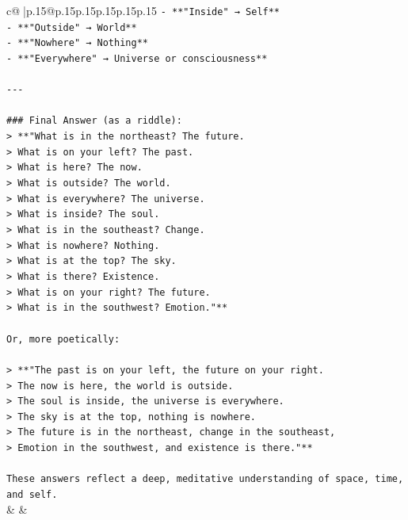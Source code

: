 \documentclass{article}
\begin{document}
{\begin{supertabular}{c@{$\;$}|p{.15\linewidth}@{}p{.15\linewidth}p{.15\linewidth}p{.15\linewidth}p{.15\linewidth}p{.15\linewidth}}
{{{\texttt{{-} **"Inside" → Self**} \\
\texttt{{-} **"Outside" → World**} \\
\texttt{{-} **"Nowhere" → Nothing**} \\
\texttt{{-} **"Everywhere" → Universe or consciousness**} \\
\\ 
\texttt{{-}{-}{-}} \\
\\ 
\texttt{\#\#\# Final Answer (as a riddle):} \\
\texttt{> **"What is in the northeast? The future.  } \\
\texttt{> What is on your left? The past.  } \\
\texttt{> What is here? The now.  } \\
\texttt{> What is outside? The world.  } \\
\texttt{> What is everywhere? The universe.  } \\
\texttt{> What is inside? The soul.  } \\
\texttt{> What is in the southeast? Change.  } \\
\texttt{> What is nowhere? Nothing.  } \\
\texttt{> What is at the top? The sky.  } \\
\texttt{> What is there? Existence.  } \\
\texttt{> What is on your right? The future.  } \\
\texttt{> What is in the southwest? Emotion."**} \\
\\ 
\texttt{Or, more poetically:} \\
\\ 
\texttt{> **"The past is on your left, the future on your right.  } \\
\texttt{> The now is here, the world is outside.  } \\
\texttt{> The soul is inside, the universe is everywhere.  } \\
\texttt{> The sky is at the top, nothing is nowhere.  } \\
\texttt{> The future is in the northeast, change in the southeast,  } \\
\texttt{> Emotion in the southwest, and existence is there."**} \\
\\ 
\texttt{These answers reflect a deep, meditative understanding of space, time, and self.} \\
            }
        }
    }
    & & \\ \\


\end{supertabular}}
\end{document}
